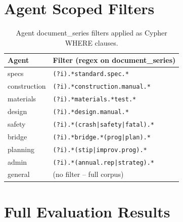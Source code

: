 \documentclass{article}
\begin{document}
\section{Agent Scoped Filters}
\label{app:filters}

\begin{table}[H]
\centering
\footnotesize
\begin{tabular}{l l}
\toprule
\textbf{Agent} & \textbf{Filter (regex on document\_series)} \\
\midrule
specs & \texttt{(?i).*standard.spec.*} \\
construction & \texttt{(?i).*construction.manual.*} \\
materials & \texttt{(?i).*materials.*test.*} \\
design & \texttt{(?i).*design.manual.*} \\
safety & \texttt{(?i).*(crash|safety|fatal).*} \\
bridge & \texttt{(?i).*bridge.*(prog|plan).*} \\
planning & \texttt{(?i).*(stip|improv.prog).*} \\
admin & \texttt{(?i).*(annual.rep|strateg).*} \\
general & (no filter -- full corpus) \\
\bottomrule
\end{tabular}
\caption{Agent document\_series filters applied as Cypher WHERE clauses.}
\label{tab:agent_filters}
\end{table}

\section{Full Evaluation Results}
\label{app:full_results}
\end{document}
